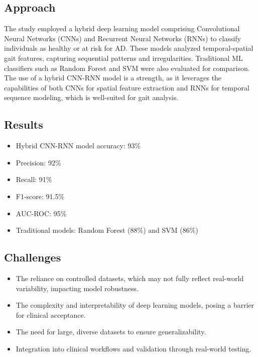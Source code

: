 \subsection*{Approach}
The study employed a hybrid deep learning model comprising Convolutional Neural Networks (CNNs) and Recurrent Neural Networks (RNNs) to classify individuals as healthy or at risk for AD. These models analyzed temporal-spatial gait features, capturing sequential patterns and irregularities. Traditional ML classifiers such as Random Forest and SVM were also evaluated for comparison. The use of a hybrid CNN-RNN model is a strength, as it leverages the capabilities of both CNNs for spatial feature extraction and RNNs for temporal sequence modeling, which is well-suited for gait analysis.

\subsection*{Results}
\begin{itemize}
    \item Hybrid CNN-RNN model accuracy: 93\%
    \item Precision: 92\% 
    \item Recall: 91\%
    \item F1-score: 91.5\%
    \item AUC-ROC: 95\%
    \item Traditional models: Random Forest (88\%) and SVM (86\%)
\end{itemize}

\subsection*{Challenges}
\begin{itemize}
    \item The reliance on controlled datasets, which may not fully reflect real-world variability, impacting model robustness.
    \item The complexity and interpretability of deep learning models, posing a barrier for clinical acceptance.
    \item The need for large, diverse datasets to ensure generalizability.
    \item Integration into clinical workflows and validation through real-world testing.
\end{itemize}

